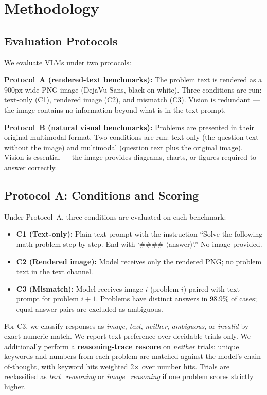\documentclass[11pt]{article}
\begin{document}
\section{Methodology}

\subsection{Evaluation Protocols}

We evaluate VLMs under two protocols:

\textbf{Protocol~A (rendered-text benchmarks):} The problem text is rendered as a 900px-wide PNG image (DejaVu Sans, black on white). Three conditions are run: text-only (C1), rendered image (C2), and mismatch (C3). Vision is redundant --- the image contains no information beyond what is in the text prompt.

\textbf{Protocol~B (natural visual benchmarks):} Problems are presented in their original multimodal format. Two conditions are run: text-only (the question text without the image) and multimodal (question text plus the original image). Vision is essential --- the image provides diagrams, charts, or figures required to answer correctly.

\subsection{Protocol A: Conditions and Scoring}

Under Protocol~A, three conditions are evaluated on each benchmark:

\begin{itemize}
    \item \textbf{C1 (Text-only):} Plain text prompt with the instruction ``Solve the following math problem step by step. End with `\#\#\#\# $\langle$answer$\rangle$'.'' No image provided.
    \item \textbf{C2 (Rendered image):} Model receives only the rendered PNG; no problem text in the text channel.
    \item \textbf{C3 (Mismatch):} Model receives image $i$ (problem $i$) paired with text prompt for problem $i{+}1$. Problems have distinct answers in 98.9\% of cases; equal-answer pairs are excluded as ambiguous.
\end{itemize}

For C3, we classify responses as \textit{image}, \textit{text}, \textit{neither}, \textit{ambiguous}, or \textit{invalid} by exact numeric match. We report text preference over decidable trials only. We additionally perform a \textbf{reasoning-trace rescore} on \textit{neither} trials: unique keywords and numbers from each problem are matched against the model's chain-of-thought, with keyword hits weighted 2$\times$ over number hits. Trials are reclassified as \textit{text\_reasoning} or \textit{image\_reasoning} if one problem scores strictly higher.
\end{document}
